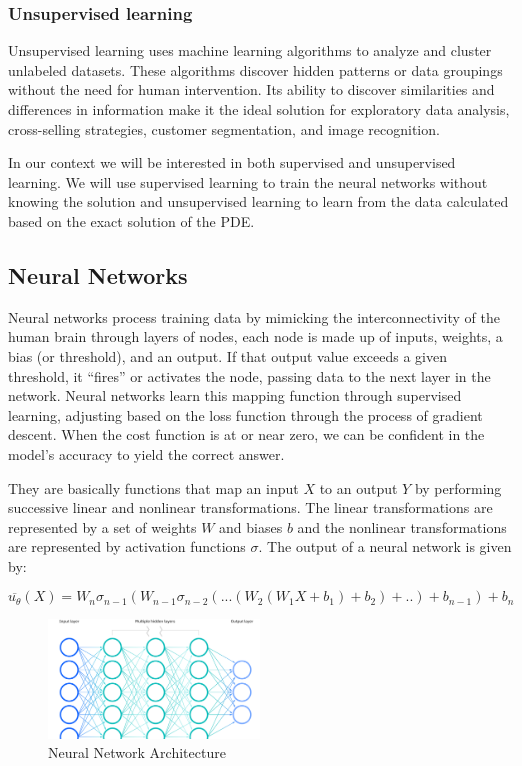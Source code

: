 \documentclass{article}
\begin{document}
\subsubsection{Unsupervised learning}
Unsupervised learning uses machine learning algorithms to analyze and cluster unlabeled datasets. These algorithms discover hidden patterns or data groupings without the need for human intervention. Its ability to discover similarities and differences in information make it the ideal solution for exploratory data analysis, cross-selling strategies, customer segmentation, and image recognition.


In our context we will be interested in both supervised and unsupervised learning. We will use supervised learning to train the neural networks without knowing the solution and unsupervised learning to learn from the data calculated based on the exact solution of the PDE.

\subsection{Neural Networks}

Neural networks process training data by mimicking the interconnectivity of the human brain through layers of nodes, each node is made up of inputs, weights, a bias (or threshold), and an output. If that output value exceeds a given threshold, it “fires” or activates the node, passing data to the next layer in the network. Neural networks learn this mapping function through supervised learning,
adjusting based on the loss function through the process of gradient descent. When the cost function is at or near zero, we can be confident in the model’s accuracy to yield the correct answer.

They are basically functions that map an input $X$ to an output $Y$ by performing successive linear and nonlinear transformations. The linear transformations are represented by a set of weights $W$ and biases $b$ and the nonlinear transformations are represented by activation functions $\sigma$. The output of a neural network is given by:

$$\overline{u_\theta}(X)=W_n\sigma_{n-1}(W_{n-1}\sigma_{n-2}(...(W_2(W_1X+b_1)+b_2)+..)+b_{n-1})+b_n$$

\begin{figure}[H]
    \centering
    \includegraphics[width=0.5\textwidth]{images/neural_network.png}
    \caption{Neural Network Architecture}
\end{figure}
\end{document}
